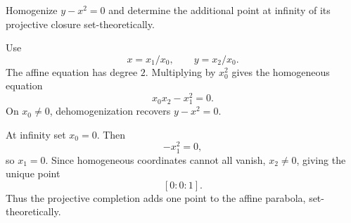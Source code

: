 \begin{problem}\label{prob:vi36-10}
Homogenize \(y-x^2=0\) and determine the additional point at infinity of its projective closure set-theoretically.
\end{problem}

\ifdefined\FullProblemDossiers
\begin{solution}
Use
\[
x=x_1/x_0,
\qquad
y=x_2/x_0.
\]
The affine equation has degree \(2\). Multiplying by \(x_0^2\) gives the homogeneous equation
\[
\boxed{x_0x_2-x_1^2=0}.
\]
On \(x_0\neq0\), dehomogenization recovers \(y-x^2=0\).

At infinity set \(x_0=0\). Then
\[
-x_1^2=0,
\]
so \(x_1=0\). Since homogeneous coordinates cannot all vanish, \(x_2\neq0\), giving the unique point
\[
\boxed{[0:0:1]}.
\]
Thus the projective completion adds one point to the affine parabola, set-theoretically.
\end{solution}
\fi

